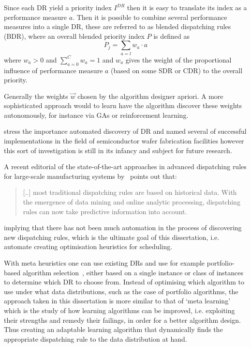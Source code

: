 \documentclass[smallextended]{svjour3}
\begin{document}
Since each DR yield a priority index $I^{DR}$ then it is easy to translate its index as a  performance measure $a$. Then it is possible to combine several performance measures into a single DR, these are referred to as blended dispatching rules (BDR), where an overall blended priority index $P$ is defined as 
\begin{equation}
P_j = \sum_{a=l} w_a \cdot a 
\end{equation}
where $w_a>0$ and $\sum_{a=0}^C w_a = 1$ and $w_a$ gives the weight of the proportional influence of performance measure $a$ (based on some SDR or CDR) to the overall priority.

Generally the weights $\vec{w}$ chosen by the algorithm designer apriori. 
A more sophisticated approach would to learn have the algorithm discover these weights autonomously, for instance via GAs or reinforcement learning. 

\cite{Monch13} stress the importance automated discovery of DR and named several of successful implementations in the field of semiconductor wafer fabrication facilities however this sort of investigation is still in its infancy and subject for future research.

A recent editorial of the state-of-the-art approaches in advanced dispatching rules for large-scale manufacturing systems by~\citet{Chen13} points out that:
\begin{quote}
[..] most traditional dispatching rules are based on historical data. With the emergence of data mining and online analytic processing, dispatching rules can now take predictive information into account.
\end{quote}
implying that there has not been much automation in the process of discovering new dispatching rules, which is the ultimate goal of this dissertation, i.e. automate creating optimisation heuristics for scheduling. 

With meta heuristics one can use existing DRs and use for example portfolio-based algorithm selection~\citep{Rice76,Gomes01}, either based on a single instance or class of instances~\citep{Xu07} to determine which DR to choose from. 
Instead of optimising which algorithm to use under what data distributions, such as the case of portfolio algorithms, the approach taken in this dissertation is more similar to that of `meta learning' \citep{Vilalta02} which is the study of how learning algorithms can be improved, i.e. exploiting their strengths and remedy their failings, in order for a better algorithm design. Thus creating an adaptable learning algorithm that dynamically finds the appropriate dispatching rule  to the data distribution at hand. 
\end{document}
